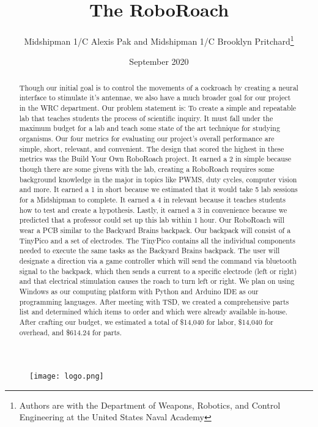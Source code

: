 \documentclass{article}
\title{The RoboRoach}
\author{Midshipman 1/C Alexis Pak and Midshipman 1/C Brooklyn Pritchard\thanks{Authors are with the Department of Weapons, Robotics, and Control Engineering at the United States Naval Academy}}
\begin{document}
\maketitle

\begin{figure}[ht!]
\centering
\texttt{[image: logo.png]}

\label{fig:logo}
\end{figure}



    \date{September 2020}

\tableofcontents

\begin{abstract}
 Though our initial goal is to control the movements of a cockroach by creating a neural interface to stimulate it’s antennae, we also have a much broader goal for our project in the WRC department. Our problem statement is: To create a simple and repeatable lab that teaches students the process of scientific inquiry. It must fall under the maximum budget for a lab and teach some state of the art technique for studying organisms. Our four metrics for evaluating our project’s overall performance are simple, short, relevant, and convenient. The design that scored the highest in these metrics was the Build Your Own RoboRoach project. It earned a 2 in simple because though there are some givens with the lab, creating a RoboRoach requires some background knowledge in the major in topics like PWMS, duty cycles, computer vision and more. It earned a 1 in short because we estimated that it would take 5 lab sessions for a Midshipman to complete. It earned a 4 in relevant because it teaches students how to test and create a hypothesis. Lastly, it earned a 3 in convenience because we predicted that a professor could set up this lab within 1 hour.  Our RoboRoach will wear a PCB similar to the Backyard Brains backpack. Our backpack will consist of a TinyPico and a set of electrodes. The TinyPico contains all the individual components needed to execute the same tasks as the Backyard Brains backpack. The user will designate a direction via a game controller which will send the command via bluetooth signal to the backpack, which then sends a current to a specific electrode (left or right) and that electrical stimulation causes the roach to turn left or right. We plan on using Windows as our computing platform with Python and Arduino IDE as our programming languages. After meeting with TSD, we created a comprehensive parts list and determined which items to order and which were already available in-house. After crafting our budget, we estimated a total of \$14,040 for labor, \$14,040 for overhead, and \$614.24 for parts. 
\end{abstract}
\end{document}
